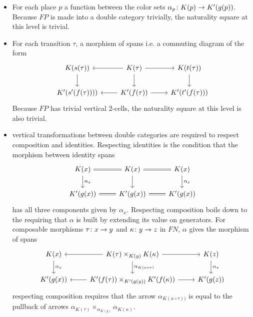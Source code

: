 \begin{itemize}
    \item For each place $p$ a function between the color sets $\alpha_p \colon K(p) \to K'(g(p)) $. Because $FP$ is made into a double category trivially, the naturality square at this level is trivial.
    \item For each transition $\tau$, a morphism of spans i.e. a commuting diagram of the form
    \[
    \begin{tikzcd}
    K(s(\tau))\ar[d] & \ar[d]K(\tau) \ar[l] \ar[r] &\ar[d] K(t(\tau)) \\
    K'(s'(f(\tau)))) & K'(f(\tau)) \ar[l] \ar[r] & K'(t'(f(\tau)))
    \end{tikzcd}
    \]
    Because $FP$ has trivial vertical 2-cells, the naturality square at this level is also trivial.
    \item vertical transformations between double categories are required to respect composition and identities. Respecting identities is the condition that the morphism between identity spans
 \[
     \begin{tikzcd}
    K(x)\ar[d, "\alpha_x"] & \ar[d]K(x) \ar[l, equal] \ar[r, equal] &\ar[d, "\alpha_x"] K(x) \\
    K'(g(x)) & K'(g(x)) \ar[l, equal] \ar[r, equal] & K'(g(x))
    \end{tikzcd}
    \]
    has all three components given by $\alpha_x$. Respecting composition boils down to the requiring that $\alpha$ is built by extending its value on generators. For composable morphisms $\tau \colon x \to y$ and $\kappa \colon y \to z$ in $FN$, $\alpha$ gives the morphism of spans
    \[
    \begin{tikzcd}
    K(x)\ar[d, "\alpha_x"] & \ar[d, "\alpha_{K(\kappa \circ \tau)}"]K(\tau) \times_{K(y)} K(\kappa) \ar[l] \ar[r] &\ar[d, "\alpha_z"] K(z) \\
    K'(g(x)) & K'(f(\tau)) \times_{K'(g(y))} K'(f(\kappa)) \ar[l] \ar[r] & K'(g(z))
    \end{tikzcd}
    \]
    respecting composition requires that the arrow $\alpha_{K (\kappa \circ \tau))}$ is equal to the pullback of arrows $\alpha_{K(\tau)} \times_{\alpha_{K(y)}} \alpha_{K(\kappa)}$.
\end{itemize}

